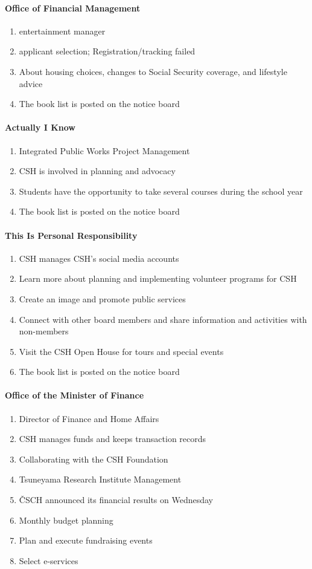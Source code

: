 \documentclass{article}
\newcommand{\asubsubsection}[1]{\paragraph{#1} \label{#1}}
\begin{document}
\asubsubsection{Office of Financial Management}
\begin{enumerate}
	\item entertainment manager
	\item applicant selection; Registration/tracking failed
	\item About housing choices, changes to Social Security coverage, and lifestyle advice
	\item The book list is posted on the notice board
\end{enumerate}

\asubsubsection{Actually I Know}
\begin{enumerate}
	\item Integrated Public Works Project Management
	\item CSH is involved in planning and advocacy
	\item Students have the opportunity to take several courses during the school year
	\item The book list is posted on the notice board
\end{enumerate}

\asubsubsection{This Is Personal Responsibility}
\begin{enumerate}
	\item CSH manages CSH's social media accounts
	\item Learn more about planning and implementing volunteer programs for CSH
	\item Create an image and promote public services
	\item Connect with other board members and share information and activities with non-members
	\item Visit the CSH Open House for tours and special events
	\item The book list is posted on the notice board
\end{enumerate}

\asubsubsection{Office of the Minister of Finance}
\begin{enumerate}
	\item Director of Finance and Home Affairs
	\item CSH manages funds and keeps transaction records
	\item Collaborating with the CSH Foundation
	\item Tsuneyama Research Institute Management
	\item ČSCH announced its financial results on Wednesday
	\item Monthly budget planning
	\item Plan and execute fundraising events
	\item Select e-services
\end{enumerate}
\end{document}
